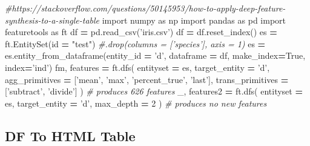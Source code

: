 \documentclass[]{book}
\newenvironment{Shaded}{\begin{snugshade}}{\end{snugshade}}
\newcommand{\DecValTok}[1]{\textcolor[rgb]{0.00,0.00,0.81}{#1}}
\newcommand{\StringTok}[1]{\textcolor[rgb]{0.31,0.60,0.02}{#1}}
\newcommand{\ImportTok}[1]{#1}
\newcommand{\CommentTok}[1]{\textcolor[rgb]{0.56,0.35,0.01}{\textit{#1}}}
\newcommand{\VariableTok}[1]{\textcolor[rgb]{0.00,0.00,0.00}{#1}}
\newcommand{\OperatorTok}[1]{\textcolor[rgb]{0.81,0.36,0.00}{\textbf{#1}}}
\newcommand{\BuiltInTok}[1]{#1}
\newcommand{\NormalTok}[1]{#1}
\theoremstyle{definition}
\theoremstyle{definition}
\theoremstyle{definition}
\theoremstyle{remark}
\begin{document}
\begin{Shaded}
\begin{Highlighting}[]
\CommentTok{#https://stackoverflow.com/questions/50145953/how-to-apply-deep-feature-synthesis-to-a-single-table}
\ImportTok{import}\NormalTok{ numpy }\ImportTok{as}\NormalTok{ np}
\ImportTok{import}\NormalTok{ pandas }\ImportTok{as}\NormalTok{ pd}
\ImportTok{import}\NormalTok{ featuretools }\ImportTok{as}\NormalTok{ ft}
\NormalTok{df }\OperatorTok{=}\NormalTok{ pd.read_csv(}\StringTok{'iris.csv'}\NormalTok{)}
\NormalTok{df }\OperatorTok{=}\NormalTok{ df.reset_index()}
\NormalTok{es }\OperatorTok{=}\NormalTok{ ft.EntitySet(}\BuiltInTok{id} \OperatorTok{=} \StringTok{"test"}\NormalTok{) }\CommentTok{#.drop(columns = ['species'], axis = 1)}
\NormalTok{es }\OperatorTok{=}\NormalTok{ es.entity_from_dataframe(entity_id }\OperatorTok{=} \StringTok{'d'}\NormalTok{, dataframe }\OperatorTok{=}\NormalTok{ df, make_index}\OperatorTok{=}\VariableTok{True}\NormalTok{, index}\OperatorTok{=}\StringTok{'ind'}\NormalTok{)}
\NormalTok{fm, features }\OperatorTok{=}\NormalTok{ ft.dfs(}
\NormalTok{    entityset }\OperatorTok{=}\NormalTok{ es, }
\NormalTok{    target_entity }\OperatorTok{=} \StringTok{'d'}\NormalTok{,}
\NormalTok{    agg_primitives }\OperatorTok{=}\NormalTok{ [}\StringTok{'mean'}\NormalTok{, }\StringTok{'max'}\NormalTok{, }\StringTok{'percent_true'}\NormalTok{, }\StringTok{'last'}\NormalTok{],}
\NormalTok{    trans_primitives }\OperatorTok{=}\NormalTok{ [}\StringTok{'subtract'}\NormalTok{, }\StringTok{'divide'}\NormalTok{]}
\NormalTok{)}
\CommentTok{# produces 626 features}
\NormalTok{_, features2 }\OperatorTok{=}\NormalTok{ ft.dfs(}
\NormalTok{    entityset }\OperatorTok{=}\NormalTok{ es, }
\NormalTok{    target_entity }\OperatorTok{=} \StringTok{'d'}\NormalTok{,}
\NormalTok{    max_depth }\OperatorTok{=} \DecValTok{2}
\NormalTok{)}
\CommentTok{# produces no new features}
\end{Highlighting}
\end{Shaded}

\subsection{DF To HTML Table}\label{df-to-html-table}
\end{document}

